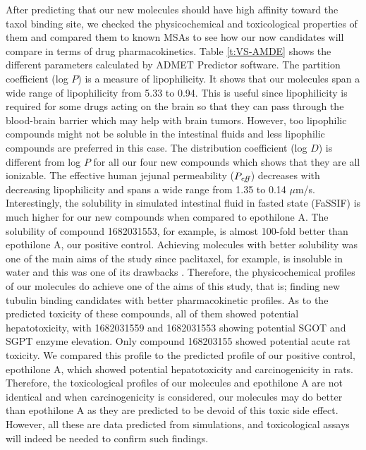 \documentclass[11pt]{report}
\begin{document}
After predicting that our new molecules should have high affinity toward the taxol binding site, we checked the physicochemical and toxicological properties of them and compared them to known \glspl{MSA} to see how our now candidates will compare in terms of drug pharmacokinetics. Table \ref{t:VS-AMDE}
shows the different parameters calculated by ADMET Predictor software. The partition coefficient (log $P$) is a measure of lipophilicity. It shows that our molecules span a wide range of lipophilicity from 5.33 to 0.94. This is useful since lipophilicity is required for some drugs acting on the brain so that they can pass through the blood-brain barrier which may help with brain tumors. However, too lipophilic compounds might not be soluble in the intestinal fluids and less lipophilic compounds are preferred in this case. The distribution coefficient (log $D$) is different from log $P$ for all our four new compounds which shows that they are all ionizable. The effective human jejunal permeability ($P_{\emph{eff}}$) decreases with decreasing lipophilicity and spans a wide range from 1.35 to 0.14 $\mu$m/s. Interestingly, the solubility in simulated intestinal fluid in fasted state (FaSSIF) is much higher for our new compounds when compared to epothilone A. The solubility of compound 1682031553, for example, is almost 100-fold better than epothilone A, our positive control. Achieving molecules with better solubility was one of the main aims of the study since paclitaxel,
for example, is insoluble in water and this was one of its drawbacks
\cite{Singla2002}. Therefore, the physicochemical profiles of our molecules do achieve one of the aims of this study, that is; finding new tubulin binding candidates with better pharmacokinetic profiles. As to the predicted toxicity of these compounds, all of them showed potential hepatotoxicity, with 1682031559 and 1682031553 showing potential SGOT and SGPT enzyme elevation. Only compound 168203155 showed potential acute rat toxicity. We compared this profile to the predicted profile of our positive control, epothilone A, which showed potential hepatotoxicity and carcinogenicity in rats. Therefore, the toxicological profiles of our molecules and epothilone A are not identical and when carcinogenicity is considered, our molecules may do better than epothilone A as they are predicted to be devoid of this toxic side effect. However, all these are data predicted from simulations, and toxicological assays will indeed be needed to confirm such findings.
\end{document}

